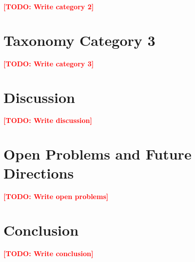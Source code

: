 \documentclass[journal]{IEEEtran}
\newcommand{\todo}[1]{\textcolor{red}{\textbf{[TODO: #1]}}}
\begin{document}
\todo{Write category 2}

\section{Taxonomy Category 3}
\label{sec:category3}

\todo{Write category 3}

\section{Discussion}
\label{sec:discussion}

\todo{Write discussion}

\section{Open Problems and Future Directions}
\label{sec:future}

\todo{Write open problems}

\section{Conclusion}
\label{sec:conclusion}

\todo{Write conclusion}



\end{document}
